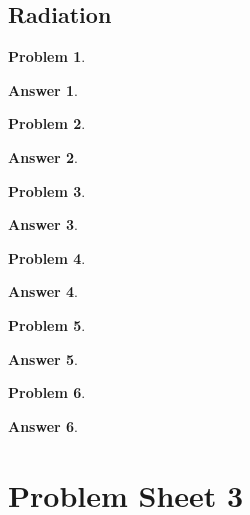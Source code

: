 \documentclass[a4paper]{article}
\newtheorem{ans}{Answer}[section]
\theoremstyle{new}
\newtheorem{qns}{Problem}[section]
\begin{document}
\subsection*{Radiation}
\begin{qns}

\end{qns}
\begin{ans}

\end{ans}
\begin{qns}

\end{qns}
\begin{ans}

\end{ans}
\newpage
\begin{qns}

\end{qns}
\begin{ans}

\end{ans}
\begin{qns}

\end{qns}
\begin{ans}

\end{ans}
\newpage
\begin{qns}

\end{qns}
\begin{ans}

\end{ans}
\begin{qns}

\end{qns}
\begin{ans}

\end{ans}
\newpage
\section{Problem Sheet 3}
\end{document}
